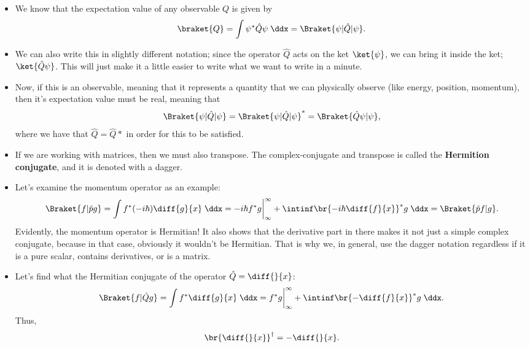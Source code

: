 \begin{itemize}
    \item We know that the expectation value of any observable $Q$ is given by
        \begin{equation*}
            \braket{Q} = \int \psi^* \hat{Q} \psi \;\ddx = \Braket{\psi | \hat{Q} | \psi}.
        \end{equation*}
    \item We can also write this in slightly different notation; since the operator $\hat{Q}$ acts on the ket $\ket{\psi}$, we can bring it inside the ket; $\ket{\hat{Q}\psi}$. This will just make it a little easier to write what we want to write in a minute.
    \item Now, if this is an observable, meaning that it represents a quantity that we can physically observe (like energy, position, momentum), then it's expectation value must be real, meaning that
        \begin{equation*}
            \Braket{\psi | \hat{Q} | \psi} = \Braket{\psi | \hat{Q} | \psi}^* = \Braket{\hat{Q}\psi | \psi},
        \end{equation*}
        where we have that $\hat{Q} = \hat{Q}*$ in order for this to be satisfied. 
    \item If we are working with matrices, then we must also transpose. The complex-conjugate and transpose is called the \textbf{Hermition conjugate}, and it is denoted with a dagger. 
    \item Let's examine the momentum operator as an example:
        \begin{equation*}
            \Braket{f | \hat{p}g} = \int f^* (-i\hbar) \diff{g}{x} \;\ddx = -i\hbar f^*g\bigg|_{\infty}^{\infty} + \intinf \br{-i\hbar \diff{f}{x}}^* g \;\ddx = \Braket{\hat{p} f | g}.
        \end{equation*}
        Evidently, the momentum operator is Hermitian! It also shows that the derivative part in there makes it not just a simple complex conjugate, because in that case, obviously it wouldn't be Hermitian. That is why we, in general, use the dagger notation regardless if it is a pure scalar, contains derivatives, or is a matrix.
    \item Let's find what the Hermitian conjugate of the operator $\hat{Q} = \diff{}{x}$:
        \begin{equation*}
            \Braket{f | \hat{Q} g} = \int f^* \diff{g}{x} \;\ddx = f^*g \bigg|_{\infty}^{\infty} + \intinf \br{-\diff{f}{x}}^* g \;\ddx.
        \end{equation*}
        Thus, 
        \begin{equation*}
            \br{\diff{}{x}}^{\dagger} = -\diff{}{x}.
        \end{equation*}
\end{itemize}


